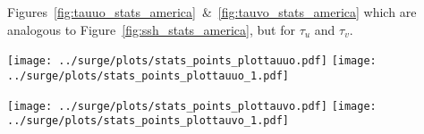 Figures~\ref{fig:tauuo_stats_america}~\&~\ref{fig:tauvo_stats_america} which
are analogous to Figure~\ref{fig:ssh_stats_america}, but for $\tau_u$ and
$\tau_v$.

\begin{figure*}[htb!]
    \centering
    \texttt{[image: ../surge/plots/stats\_points\_plottauuo.pdf]}
       \hspace{0pt} \texttt{[image: ../surge/plots/stats\_points\_plottauuo\_1.pdf]}
    \vspace{-7pt}
    \caption{\texttt{tauuo}, $\tau_u$ for \texttt{tyr}, \texttt{eUS}}
   \label{fig:tauuo_stats_america}

   \texttt{[image: ../surge/plots/stats\_points\_plottauvo.pdf]}
      \hspace{0pt} \texttt{[image: ../surge/plots/stats\_points\_plottauvo\_1.pdf]}
   \vspace{-7pt}
   \caption{\texttt{tauvo}, $\tau_v$ for \texttt{tyr}, \texttt{eUS}}
  \label{fig:tauvo_stats_america}
\end{figure*}
